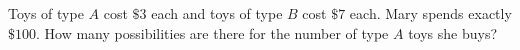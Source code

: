 Toys of type $A$ cost $\$3$ each and toys of type $B$ cost $\$7$ each. Mary spends exactly $\$100$. How many possibilities are there for the number of type $A$ toys she buys?
